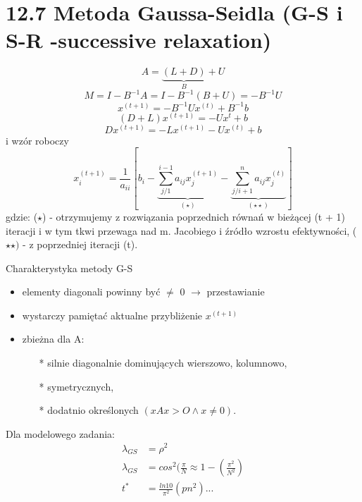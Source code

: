 \section{12.7 Metoda Gaussa-Seidla (G-S i S-R -successive relaxation)}

\begin{frame}{}
  $$A=\underbrace{(L+D)}_{B}+U$$
  $$M=I-B^{-1}A=I-B^{-1}(B+U)=-B^{-1}U$$
  $$x^{(t+1)}=-B^{-1}Ux^{(t)}+B^{-1}b$$
  $$(D+L)x^{(t+1)}=-Ux^t+b$$
  $$\boxed{Dx^{(t+1)}=-Lx^{(t+1)}-Ux^{(t)}+b}$$
  i wzór roboczy
  $$x^{(t+1)}_i=\frac{1}{a_{ii}}[b_i-\underbrace{\sum^{i-1}_{j/1} a_{ij}x^{(t+1)}_j}_{(\star)}-\underbrace{\sum^{n}_{j/i+1} a_{ij}x^{(t)}_{j}}_{(\star\star)}]$$
  gdzie: ($\star$) - otrzymujemy z rozwiązania poprzednich równań w bieżącej (t + 1) iteracji i w tym tkwi przewaga nad m. Jacobiego i źródło wzrostu efektywności, ($\star\star)$ - z poprzedniej iteracji (t).
\end{frame}

\begin{frame}{}
  \begin{block}{Charakterystyka metody G-S}
    \begin{itemize}
      \item elementy diagonali powinny być $\neq$ 0 $\rightarrow$ przestawianie
      \item wystarczy pamiętać aktualne przybliżenie $x^{(t+1)}$
      \item zbieżna dla A:
      \begin{itemize}
        \item[*] silnie diagonalnie dominujących wierszowo, kolumnowo,
        \item[*] symetrycznych,
        \item[*] dodatnio określonych $(xAx>O\wedge x\neq 0)$.
      \end{itemize}
    \end{itemize}
  \end{block}
\end{frame}

\begin{frame}{}
  Dla modelowego zadania:
  \begin{align*}
  \lambda_{GS}&=\rho^2\\
  \lambda_{GS}&=cos^2(\frac{\pi}{N}\approx 1-(\frac{\pi^2}{N^2})\\
          t^* &= \frac{ln10}{\pi^2}(pn^2)...
  \end{align*}
\end{frame}

